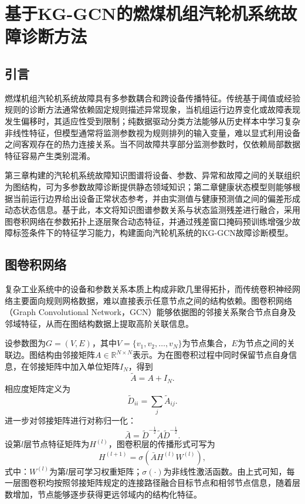 \section{基于KG-GCN的燃煤机组汽轮机系统故障诊断方法}
\label{sec:kg_gcn_v6}

\subsection{引言}

燃煤机组汽轮机系统故障具有多参数耦合和跨设备传播特征。传统基于阈值或经验规则的诊断方法通常依赖固定规则描述异常现象，当机组运行边界变化或故障表现发生偏移时，其适应性受到限制；纯数据驱动分类方法能够从历史样本中学习复杂非线性特征，但模型通常将监测参数视为规则排列的输入变量，难以显式利用设备之间客观存在的热力连接关系。当不同故障共享部分监测参数时，仅依赖局部数据特征容易产生类别混淆。

第三章构建的汽轮机系统故障知识图谱将设备、参数、异常和故障之间的关联组织为图结构，可为多参数故障诊断提供静态领域知识；第二章健康状态模型则能够根据当前运行边界给出设备正常状态参考，并由实测值与健康预测值之间的偏差形成动态状态信息。基于此，本文将知识图谱参数关系与状态监测残差进行融合，采用图卷积网络在参数拓扑上逐层聚合动态特征，并通过残差窗口掩码预训练增强少故障标签条件下的特征学习能力，构建面向汽轮机系统的KG-GCN故障诊断模型。

\subsection{图卷积网络}
\label{subsec:gcn_theory_v6}

复杂工业系统中的设备和参数关系本质上构成非欧几里得拓扑，而传统卷积神经网络主要面向规则网格数据，难以直接表示任意节点之间的结构依赖。图卷积网络（Graph Convolutional Network，GCN）能够依据图的邻接关系聚合节点自身及邻域特征，从而在图结构数据上提取高阶关联信息\cite{Kipf2017GCN}。

设参数图为$G=(V,E)$，其中$V=\{v_1,v_2,\ldots,v_N\}$为节点集合，$E$为节点之间的关联边。图结构由邻接矩阵$A\in\mathbb R^{N\times N}$表示。为在图卷积过程中同时保留节点自身信息，在邻接矩阵中加入单位矩阵$I_N$，得到
\begin{equation}
\tilde A=A+I_N.
\end{equation}
相应度矩阵定义为
\begin{equation}
\tilde D_{ii}=\sum_j\tilde A_{ij}.
\end{equation}
进一步对邻接矩阵进行对称归一化：
\begin{equation}
\bar A=\tilde D^{-\frac{1}{2}}\tilde A\tilde D^{-\frac{1}{2}}.
\end{equation}
设第$l$层节点特征矩阵为$H^{(l)}$，图卷积层的传播形式可写为
\begin{equation}
H^{(l+1)}=\sigma\left(\bar A H^{(l)}W^{(l)}\right),
\end{equation}
式中：$W^{(l)}$为第$l$层可学习权重矩阵；$\sigma(\cdot)$为非线性激活函数。由上式可知，每一层图卷积均按照邻接矩阵规定的连接路径融合目标节点和相邻节点信息，随着层数增加，节点能够逐步获得更远邻域内的结构化特征。

